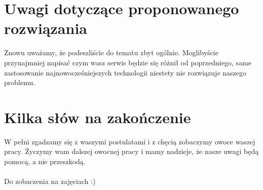 \documentclass[10pt,a4paper]{article}
\begin{document}
\section{Uwagi dotyczące proponowanego rozwiązania}
Znowu uważamy, że podeszliście do tematu zbyt ogólnie. Moglibyście przynajmniej napisać czym wasz serwis będzie się różnił od poprzedniego, same zastosowanie najnowocześniejszych technologii niestety nie rozwiązuje naszego problemu.
\section{Kilka słów na zakończenie}
W pełni zgadzamy się z waszymi postulatami i z chęcią zobaczymy owoce waszej pracy. Życzymy wam dalszej owocnej pracy i mamy nadzieje, że nasze uwagi będą pomocą, a nie przeszkodą.\\ \\ Do zobaczenia na zajęciach :)
\end{document}
